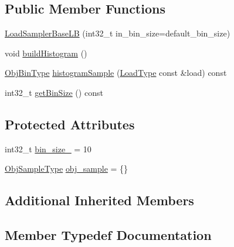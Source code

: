 \subsection*{Public Member Functions}
\begin{DoxyCompactItemize}
\item 
\hyperlink{structvt_1_1vrt_1_1collection_1_1lb_1_1_load_sampler_base_l_b_aab64749619cb27593054fd9997079f6c}{Load\+Sampler\+Base\+LB} (int32\+\_\+t in\+\_\+bin\+\_\+size=default\+\_\+bin\+\_\+size)
\item 
void \hyperlink{structvt_1_1vrt_1_1collection_1_1lb_1_1_load_sampler_base_l_b_a516efe2183a03fd5fec8122c11295b4c}{build\+Histogram} ()
\item 
\hyperlink{structvt_1_1vrt_1_1collection_1_1lb_1_1_load_sampler_base_l_b_acb55af31b27a3c248d351189abd78487}{Obj\+Bin\+Type} \hyperlink{structvt_1_1vrt_1_1collection_1_1lb_1_1_load_sampler_base_l_b_a7995a55d984d102c0d45d68f398b6ab7}{histogram\+Sample} (\hyperlink{structvt_1_1vrt_1_1collection_1_1lb_1_1_base_l_b_a215e22b9f12678303f49615ae3be05cc}{Load\+Type} const \&load) const
\item 
int32\+\_\+t \hyperlink{structvt_1_1vrt_1_1collection_1_1lb_1_1_load_sampler_base_l_b_a4577bbd89d1005f17eb4064ab70034bc}{get\+Bin\+Size} () const
\end{DoxyCompactItemize}
\subsection*{Protected Attributes}
\begin{DoxyCompactItemize}
\item 
int32\+\_\+t \hyperlink{structvt_1_1vrt_1_1collection_1_1lb_1_1_load_sampler_base_l_b_ae3be6a0560eb24b5796ad3f3612c9524}{bin\+\_\+size\+\_\+} = 10
\item 
\hyperlink{structvt_1_1vrt_1_1collection_1_1lb_1_1_load_sampler_base_l_b_a8d939a849ec0d6371c1c4d441ffb9b94}{Obj\+Sample\+Type} \hyperlink{structvt_1_1vrt_1_1collection_1_1lb_1_1_load_sampler_base_l_b_afeeba35f0a0a1fa71dc438270303006f}{obj\+\_\+sample} = \{\}
\end{DoxyCompactItemize}
\subsection*{Additional Inherited Members}


\subsection{Member Typedef Documentation}
\mbox{\label{structvt_1_1vrt_1_1collection_1_1lb_1_1_load_sampler_base_l_b_a58de8f1e1204cf52b661b3906e2d9eeb}} 
